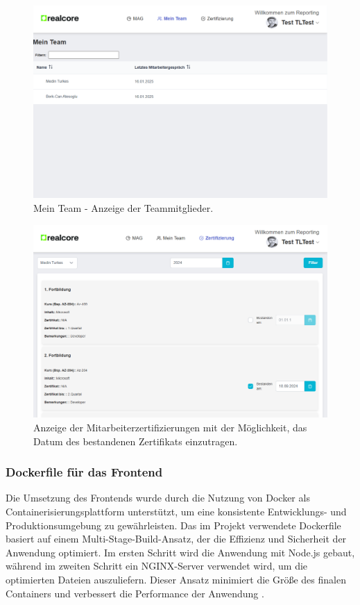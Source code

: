 \begin{figure}[H] \centering \includegraphics[width=\textwidth]{images/meinteam.png} \caption{Mein Team - Anzeige der Teammitglieder.} \label{fig:data_entry} \end{figure}

\begin{figure}[H]
    \centering
    \includegraphics[width=\textwidth]{images/zertifkatshow.png}
    \caption{Anzeige der Mitarbeiterzertifizierungen mit der Möglichkeit, das Datum des bestandenen Zertifikats einzutragen.}
    \label{fig:zertifikatanzeige}
\end{figure}


\subsubsection*{Dockerfile für das Frontend}
Die Umsetzung des Frontends wurde durch die Nutzung von Docker als Containerisierungsplattform unterstützt, um eine konsistente Entwicklungs- und Produktionsumgebung zu gewährleisten. Das im Projekt verwendete Dockerfile basiert auf einem Multi-Stage-Build-Ansatz, der die Effizienz und Sicherheit der Anwendung optimiert. Im ersten Schritt wird die Anwendung mit Node.js gebaut, während im zweiten Schritt ein NGINX-Server verwendet wird, um die optimierten Dateien auszuliefern. Dieser Ansatz minimiert die Größe des finalen Containers und verbessert die Performance der Anwendung \cite{docker2020mastery, docker2019production}.


